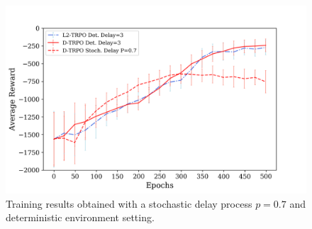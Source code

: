             \begin{figure}[!b]
                \includegraphics[width=15cm, keepaspectratio]{images/results/delayp07_comparisons_1.png}
                \caption{Training results obtained with a stochastic delay process $p=0.7$ and deterministic environment setting.}
                \label{fig:results_delayp07_1}
            \end{figure}
            
